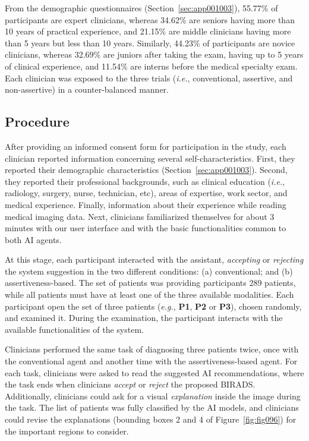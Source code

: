 From the demographic questionnaires (Section~\ref{sec:app001003}), 55.77\% of participants are expert clinicians, whereas 34.62\% are seniors having more than 10 years of practical experience, and 21.15\% are middle clinicians having more than 5 years but less than 10 years.
Similarly, 44.23\% of participants are novice clinicians, whereas 32.69\% are juniors after taking the exam, having up to 5 years of clinical experience, and 11.54\% are interns before the medical specialty exam.
Each clinician was exposed to the three trials ({\it i.e.}, conventional, assertive, and non-assertive) in a counter-balanced manner.

\subsection{Procedure}
\label{sec:chap006005004}

After providing an informed consent form for participation in the study, each clinician reported information concerning several self-characteristics.
First, they reported their demographic characteristics (Section~\ref{sec:app001003}).
Second, they reported their professional backgrounds, such as clinical education ({\it i.e.}, radiology, surgery, nurse, technician, etc), areas of expertise, work sector, and medical experience.
Finally, information about their experience while reading medical imaging data.
Next, clinicians familiarized themselves for about 3 minutes with our user interface and with the basic functionalities common to both AI agents.

At this stage, each participant interacted with the assistant, {\it accepting} or {\it rejecting} the system suggestion in the two different conditions: (a) conventional; and (b) assertiveness-based.
The set of patients was providing participants 289 patients, while all patients must have at least one of the three available modalities.
Each participant open the set of three patients ({\it e.g.}, {\bf P1}, {\bf P2} or {\bf P3}), chosen randomly, and examined it.
During the examination, the participant interacts with the available functionalities of the system.

Clinicians performed the same task of diagnosing three patients twice, once with the conventional agent and another time with the assertiveness-based agent.
For each task, clinicians were asked to read the suggested AI recommendations, where the task ends when clinicians {\it accept} or {\it reject} the proposed BIRADS.
Additionally, clinicians could ask for a visual {\it explanation} inside the image during the task.
The list of patients was fully classified by the AI models, and clinicians could revise the explanations (bounding boxes 2 and 4 of Figure~\ref{fig:fig096}) for the important regions to consider.

